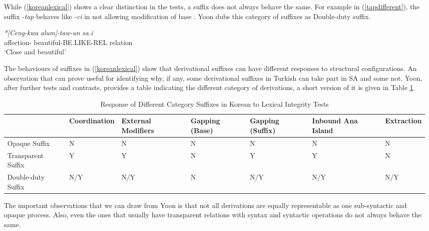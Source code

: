 While (\ref{koreanlexical}) shows a clear distinction in the tests, a suffix does not always behave the same. For example in (\ref{tapdifferent}), the suffix \textit{-tap} behaves like \textit{-ci} in not allowing modification of base . Yoon dubs this category of suffixes as Double-duty suffix.
\begin{exe}
    \ex \label{tapdifferent}
    \gll 
    \textit{*[Ceng-kwa} \textit{alum]-taw-un} \textit{sa.i} \\ affection-{\Conj} beautiful-BE.LIKE-REL relation \\ 
    \glt `Close and beautiful'
\end{exe}

The behaviours of suffixes in (\ref{koreanlexical}) show that derivational suffixes can have different responses to structural configurations. An observation that can prove useful for identifying why, if any, some derivational suffixes in Turkish can take part in SA and some not. Yoon, after further tests and contrasts, provides a table indicating the different category of derivations, a short version of it is given in Table \ref{tab:korean}.

\begin{table}[hbt!]
    \caption{Response of Different Category Suffixes in Korean to Lexical Integrity Tests}
    \centering
    \begin{tabular}{|p{1.8cm}|p{2.1cm}|p{1.7cm}|p{1.6cm}|p{1.6cm}|p{2cm}|p{1.8cm}|}
    \hline 
                        & Coordination & External Modifiers & Gapping (Base) & Gapping (Suffix) & Inbound Ana Island & Extraction \\ \hline 
    Opaque Suffix       & N             & N                 & N             & N                 & N   & N \\ \hline 
    Transparent Suffix  & Y             & Y                 & N             & Y                 & Y   & N \\ \hline 
    Double-duty Suffix  & N/Y           & N/Y               & N             & N/Y               & N/Y & N/Y \\ \hline 
    \end{tabular}
    \label{tab:korean}
\end{table}

The important observations that we can draw from Yoon is that not all derivations are equally representable as one sub-syntactic and opaque process. Also, even the ones that usually have transparent relations with syntax and syntactic operations do not always behave the same. 

